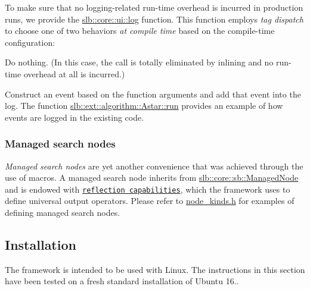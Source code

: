 To make sure that no logging-\/related run-\/time overhead is incurred in production runs, we provide the \hyperlink{namespaceslb_1_1core_1_1ui_acdeb0db1847459cac6f4eeb22bbb5998}{slb\+::core\+::ui\+::log} function. This function employs {\itshape tag dispatch} to choose one of two behaviors {\itshape at compile time} based on the compile-\/time configuration\+:
\begin{DoxyItemize}
\item Do nothing. (In this case, the call is totally eliminated by inlining and no run-\/time overhead at all is incurred.)
\item Construct an event based on the function arguments and add that event into the log. The function \hyperlink{structslb_1_1ext_1_1algorithm_1_1Astar_af46d0fe401539d7ae297dc4d059f5b5f}{slb\+::ext\+::algorithm\+::\+Astar\+::run} provides an example of how events are logged in the existing code.
\end{DoxyItemize}\hypertarget{index_s-nodes}{}\subsubsection{Managed search nodes}\label{index_s-nodes}
{\itshape Managed search nodes} are yet another convenience that was achieved through the use of macros. A managed search node inherits from \hyperlink{structslb_1_1core_1_1sb_1_1ManagedNode}{slb\+::core\+::sb\+::\+Managed\+Node} and is endowed with \href{http://stackoverflow.com/a/11744832/2725810}{\tt reflection capabilities}, which the framework uses to define universal output operators. Please refer to \hyperlink{node__kinds_8h}{node\+\_\+kinds.\+h} for examples of defining managed search nodes.\hypertarget{index_s-install}{}\subsection{Installation}\label{index_s-install}
The framework is intended to be used with {\ttfamily Linux}. The instructions in this section have been tested on a fresh standard installation of {\ttfamily Ubuntu 16.}.

